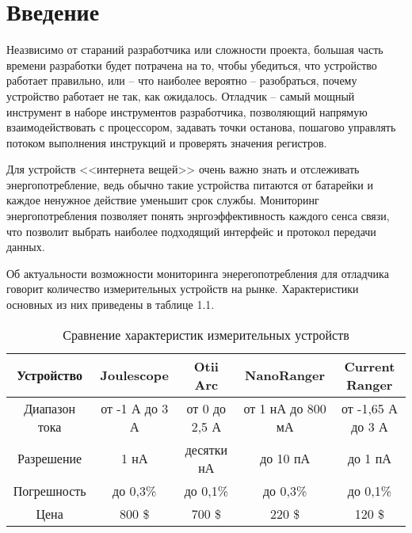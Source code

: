 
\chapter{Введение}
\hspace{1cm} Неазвисимо от стараний разработчика или сложности проекта, большая часть времени разработки
будет потрачена на то, чтобы убедиться, что устройство работает правильно, или -- что наиболее
вероятно -- разобраться, почему устройство работает не так, как ожидалось. Отладчик -- самый мощный 
инструмент в наборе инструментов разработчика, позволяющий напрямую взаимодействовать с процессором,
задавать точки останова, пошагово управлять потоком выполнения инструкций и проверять  значения
регистров. \cite{Lakamera:embed}

Для устройств <<интернета вещей>> очень важно знать и отслеживать энергопотребление,
ведь обычно такие устройства питаются от батарейки и каждое ненужное действие уменьшит
срок службы. Мониторинг энергопотребления позволяет понять энргоэффективность каждого сенса связи,
что позволит выбрать наиболее подходящий интерфейс и протокол передачи данных.

Об актуальности возможности мониторинга энерегопотребления для отладчика говорит количество 
измерительных устройств на рынке. Характеристики основных из них приведены в таблице 1.1.

\begin{table}[H]
    \caption{Сравнение характеристик измерительных устройств}   
    \begin{center}
    \begin{tabular}{|c|c|c|c|c|}
    \hline
  Устройство & Joulescope & Otii Arc & NanoRanger & Current Ranger \\ \hline
    Диапазон тока & от -1 А до 3 А & от 0 до 2,5 А & от 1 нА до 800 мА & от -1,65 А до 3 А \\ \hline
    Разрешение & 1 нА & десятки нА & до 10 пА & до 1 пА  \\ \hline
    Погрешность & до 0,3\% & до 0,1\% & до 0,3\% & до 0,1\% \\ \hline
    Цена & 800 \$ & 700 \$ & 220 \$ & 120 \$  \\ \hline
    \end{tabular}
    \end{center}
\end{table} 


